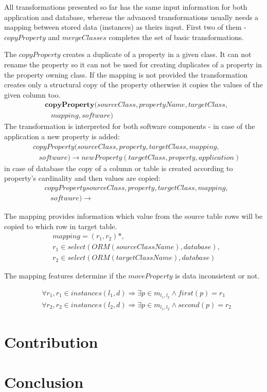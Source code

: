 \documentclass[11pt]{article}
\begin{document}
All transformations presented so far has the same input information for both application and database, whereas the advanced transformations usually needs a mapping between stored data (instances) as theirs input. First two of them - $copyProperty$ and $mergeClasses$ completes the set of basic transformations.

The $copyProperty$ creates a duplicate of a property in a given class. It can not rename the property so it can not be used for creating duplicates of a property in the property owning class. If the mapping is not provided the transformation creates only a structural copy of the property otherwise it copies the values of the given column too.
\begin{align*}
& \mathbf{copyProperty}(sourceClass, propertyName, targetClass, \\
& \; \; \; mapping, software) 
\end{align*}
The transformation is interpreted for both software components - in case of the application a new property is added:
\begin{align*}
& copyProperty(sourceClass, property, targetClass, mapping, \\ 
&  \; \; \; software) \rightarrow newProperty(targetClass, property, application) 
\end{align*}
in case of database the copy of a column or table is created according to property's cardinality and then values are copied:
\begin{align*}
& copyPropertysourceClass, property, targetClass, mapping, \\ 
&  \; \; \; software) \rightarrow 
\end{align*}


The mapping provides information which value from the source table rows will be copied to which row in target table. 
\begin{align*}
&	mapping =  (r_1, r_2)*,\\
& 	r_1 \in select(ORM(sourceClassName), database), \\
& 	r_2 \in select(ORM(targetClassName), database) 
\end{align*}

The mapping features determine if the $moveProperty$ is data inconsistent or not.


\begin{align*}
&	\forall r_1, r_1 \in instances(l_1, d) \Rightarrow \exists p \in m_{l_1, l_2} \wedge first(p) = r_1 \\
&	\forall r_2, r_2 \in instances(l_2, d) \Rightarrow \exists p \in m_{l_1, l_2} \wedge second(p) = r_2
\end{align*}


\section{Contribution}
\label{sec:contribution}

\section{Conclusion}
\end{document}
